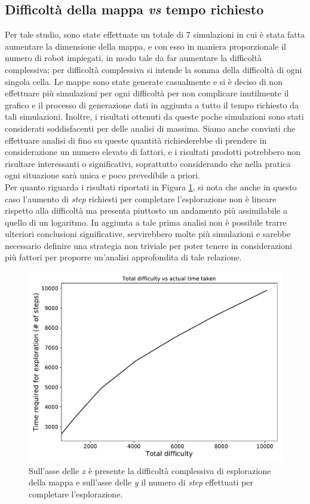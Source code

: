 \subsection{Difficoltà della mappa \textit{vs} tempo richiesto}
Per tale studio, sono state effettuate un totale di 7 simulazioni in cui è stata fatta aumentare la dimensione della mappa, e con esso in maniera proporzionale il numero di robot impiegati, in modo tale da far aumentare la difficoltà complessiva; per difficoltà complessiva si intende la somma della difficoltà di ogni singola cella.
Le mappe sono state generate casualmente e si è deciso di non effettuare più simulazioni per ogni difficoltà per non complicare inutilmente il grafico e il processo di generazione dati in aggiunta a tutto il tempo richiesto da tali simulazioni. Inoltre, i risultati ottenuti da queste poche simulazioni sono stati considerati soddisfacenti per delle analisi di massima.
Siamo anche convinti che effettuare analisi di fino su queste quantità richiederebbe di prendere in considerazione un numero elevato di fattori, e i risultati prodotti potrebbero non risultare interessanti o significativi, soprattutto considerando che nella pratica ogni situazione sarà unica e poco prevedibile a priori.\\
Per quanto riguarda i risultati riportati in Figura \ref{fig:difficulty}, si nota che anche in questo caso l'aumento di \textit{step} richiesti per completare l'esplorazione non è lineare rispetto alla difficoltà ma presenta piuttosto un andamento più assimilabile a quello di un logaritmo.
In aggiunta a tale prima analisi non è possibile trarre ulteriori conclusioni significative, servirebbero molte più simulazioni e sarebbe necessario definire una strategia non triviale per poter tenere in considerazioni più fattori per proporre un'analisi approfondita di tale relazione.
\begin{figure}
	\centering
	\includegraphics[width=0.9\linewidth]{images/macro_results/difficulty}
	\caption{Sull'asse delle \textit{x} è presente la difficoltà complessiva di esplorazione della mappa e sull'asse delle \textit{y} il numero di \textit{step} effettuati per completare l'esplorazione.}
	\label{fig:difficulty}
\end{figure}
